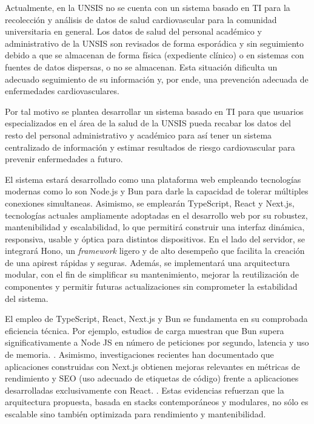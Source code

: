 

    Actualmente, en la UNSIS no se cuenta con un sistema basado en TI para la recolección y análisis de datos de salud cardiovascular para la comunidad universitaria en general. Los datos de salud del personal académico y administrativo de la UNSIS son revisados de forma esporádica y sin seguimiento debido a que se almacenan de forma física (expediente clínico) o en sistemas con fuentes de datos dispersas, o no se almacenan. Esta situación dificulta un adecuado seguimiento de su información y, por ende, una prevención adecuada de enfermedades cardiovasculares. 

    Por tal motivo se plantea desarrollar un sistema basado en TI para que usuarios especializados en el área de la salud de la UNSIS pueda recabar los datos del resto del personal administrativo y académico para así tener un sistema centralizado de información y estimar resultados de riesgo cardiovascular para prevenir enfermedades a futuro.
    
    El sistema estará desarrollado como una plataforma web empleando tecnologías modernas como lo son Node.js y Bun para darle la capacidad de tolerar múltiples conexiones simultaneas. Asimismo, se emplearán TypeScript, React y Next.js, tecnologías actuales ampliamente adoptadas en el desarrollo web por su robustez, mantenibilidad y escalabilidad, lo que permitirá construir una interfaz dinámica, responsiva, usable y óptica para distintos dispositivos. En el lado del servidor, se integrará Hono, un \textit{framework} ligero y de alto desempeño que facilita la creación de una \gls{apirest} rápidas y seguras. Además, se implementará una arquitectura modular, con el fin de simplificar su mantenimiento, mejorar la reutilización de componentes y permitir futuras actualizaciones sin comprometer la estabilidad del sistema.

    El empleo de TypeScript, React, Next.js y Bun se fundamenta en su comprobada eficiencia técnica. Por ejemplo, estudios de carga muestran que Bun supera significativamente a Node JS en número de peticiones por segundo, latencia y uso de memoria. \textcite{bun2024loadtesting}.
    Asimismo, investigaciones recientes han documentado que aplicaciones construidas con Next.js obtienen mejoras relevantes en métricas de rendimiento y SEO (uso adecuado de etiquetas de código) frente a aplicaciones desarrolladas exclusivamente con React. \textcite{patel2023nextjsperformance}.
    Estas evidencias refuerzan que la arquitectura propuesta, basada en stacks contemporáneos y modulares, no sólo es escalable sino también optimizada para rendimiento y mantenibilidad.


